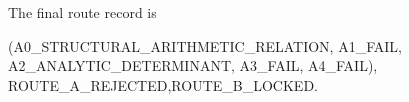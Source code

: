 The final route record is
\begin{center}
\small\ttfamily
(A0\_STRUCTURAL\_ARITHMETIC\_RELATION,\allowbreak
 A1\_FAIL,\allowbreak
 A2\_ANALYTIC\_DETERMINANT,\allowbreak
 A3\_FAIL,\allowbreak
 A4\_FAIL),\\[2pt]
ROUTE\_A\_REJECTED,\qquad ROUTE\_B\_LOCKED.
\end{center}
